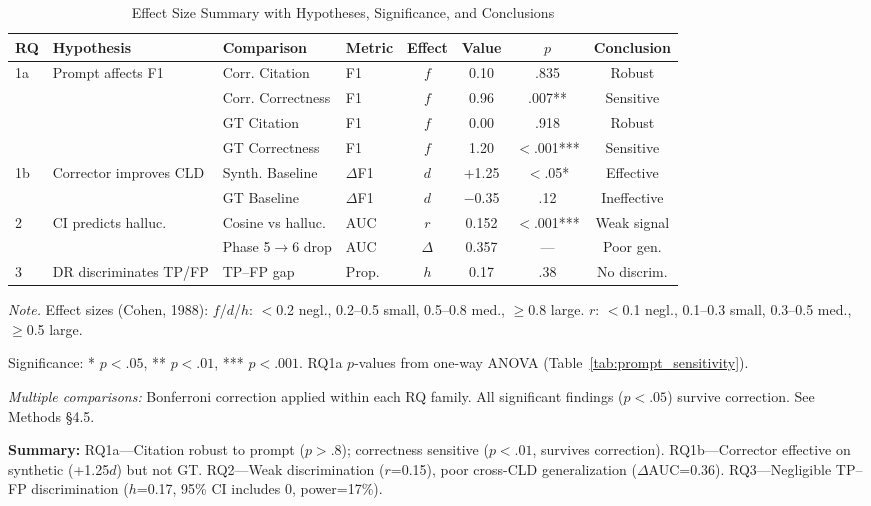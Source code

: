 \begin{table}[H]
\centering
\caption{Effect Size Summary with Hypotheses, Significance, and Conclusions}
\label{tab:effect_sizes}
\begin{threeparttable}
\scriptsize
\begin{tabular}{llllcccc}
\toprule
\textbf{RQ} & \textbf{Hypothesis} & \textbf{Comparison} & \textbf{Metric} & \textbf{Effect} & \textbf{Value} & \textbf{$p$} & \textbf{Conclusion} \\
\midrule
1a & Prompt affects F1 & Corr. Citation & F1 & $f$ & 0.10 & .835 & Robust \\
   &                   & Corr. Correctness & F1 & $f$ & 0.96 & .007** & Sensitive \\
   &                   & GT Citation & F1 & $f$ & 0.00 & .918 & Robust \\
   &                   & GT Correctness & F1 & $f$ & 1.20 & $<$.001*** & Sensitive \\
\midrule
1b & Corrector improves CLD & Synth. Baseline & $\Delta$F1 & $d$ & +1.25 & $<$.05* & Effective \\
   &                        & GT Baseline & $\Delta$F1 & $d$ & $-$0.35 & .12 & Ineffective \\
\midrule
2 & CI predicts halluc. & Cosine vs halluc. & AUC & $r$ & 0.152 & $<$.001*** & Weak signal \\
  &                     & Phase 5$\to$6 drop & AUC & $\Delta$ & 0.357 & — & Poor gen. \\
\midrule
3 & DR discriminates TP/FP & TP--FP gap & Prop. & $h$ & 0.17 & .38 & No discrim. \\
\bottomrule
\end{tabular}
\begin{tablenotes}
\scriptsize
\item \textit{Note.} Effect sizes (Cohen, 1988): $f$/$d$/$h$: $<$0.2 negl., 0.2--0.5 small, 0.5--0.8 med., $\geq$0.8 large. $r$: $<$0.1 negl., 0.1--0.3 small, 0.3--0.5 med., $\geq$0.5 large.
\item Significance: * $p<.05$, ** $p<.01$, *** $p<.001$. RQ1a $p$-values from one-way ANOVA (Table~\ref{tab:prompt_sensitivity}).
\item \textit{Multiple comparisons:} Bonferroni correction applied within each RQ family. All significant findings ($p<.05$) survive correction. See Methods \S4.5.
\item \textbf{Summary:} RQ1a---Citation robust to prompt ($p>.8$); correctness sensitive ($p<.01$, survives correction). RQ1b---Corrector effective on synthetic (+1.25$d$) but not GT. RQ2---Weak discrimination ($r$=0.15), poor cross-CLD generalization ($\Delta$AUC=0.36). RQ3---Negligible TP--FP discrimination ($h$=0.17, 95\% CI includes 0, power=17\%).
\end{tablenotes}
\end{threeparttable}
\end{table}

